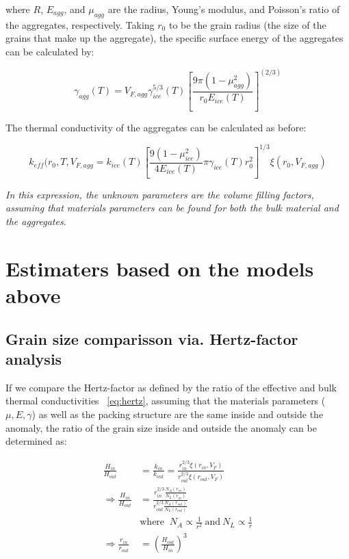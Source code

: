 \documentclass[11pt]{article} %
\newcommand{\vf}{\ensuremath{V_{F}}\xspace}
\begin{document}
	 where $R$, $E_{agg}$, and $\mu_{agg}$ are the radius, Young's modulus, and Poisson's ratio of the aggregates, respectively. Taking $r_{0}$ to be the grain radius (the size of the grains that make up the aggregate), the specific surface energy of the aggregates can be calculated by:
	 
	 \begin{equation}
	 \gamma_{agg}(T) = V_{F, agg} \gamma_{ice}^{5/3}(T)[\frac{9 \pi (1-\mu_{agg}^{2})}{r_{0} E_{ice}(T)}]^(2/3)
	 \end{equation}
	 
	 The thermal conductivity of the aggregates can be calculated as before:
	 
	 \begin{equation}
	 k_{eff}(r_{0}, T, V_{F, agg} = k_{ice}(T) [\frac{9 (1-\mu_{ice}^{2})}{4 E_{ice}(T)}\pi \gamma_{ice}(T) r_{0}^{2} ]^{1/3}\xi(r_{0}, V_{F, agg})
	 \end{equation}
	 
	\emph{ In this expression, the unknown parameters are the volume filling factors, assuming that materials parameters can be found for both the bulk material and the aggregates.}
	
\section{Estimaters based on the models above}
	
\subsection{Grain size comparisson via. Hertz-factor analysis}
	
	If we compare the Hertz-factor as defined by the ratio of the effective and bulk thermal conductivities ~\eqref{eq:hertz}, assuming that the materials parameters ($\mu, E, \gamma$) as well as the packing structure are the same inside and outside the anomaly, the ratio of the grain size inside and outside the anomaly can be determined as:
	
	\begin{equation}
	\begin{split}
	\frac{H_{in}}{H_{out}} &= \frac{k_{in}}{k_{out}} = \frac{r_{in}^{2/3} \xi(r_{in}, \vf)}{r_{out}^{2/3} \xi(r_{out}, \vf)} \\
	\Rightarrow \frac{H_{in}}{H_{out}} &= \frac{r_{in}^{2/3} \frac{N_{A}(r_{in})}{N_{L}(r_{in})}}{r_{out}^{2/3} \frac{N_{A}(r_{out})}{N_{L}(r_{out})}} \\
	& \text{where }\: N_{A}\varpropto \frac{1}{r^{2}} \: \text{and} \: N_{L}\varpropto \frac{1}{r} \\
	\Rightarrow \frac{r_{in}}{r_{out}} &= (\frac{H_{out}}{H_{in}})^{3}
	\end{split}
	\end{equation}
	
\end{document}
